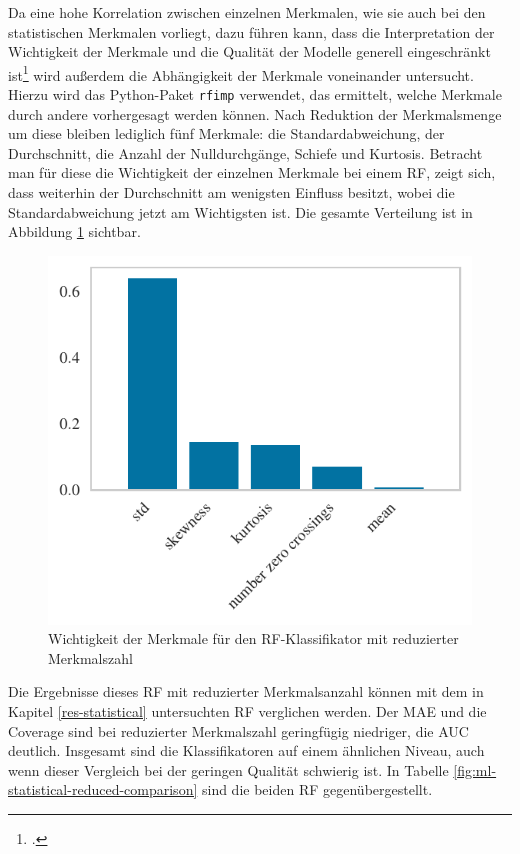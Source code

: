 Da eine hohe Korrelation zwischen einzelnen Merkmalen, wie sie auch bei den statistischen Merkmalen vorliegt, dazu führen kann, dass die Interpretation der Wichtigkeit der Merkmale und die Qualität der Modelle generell eingeschränkt ist\footcite[Kapitel 8]{Harrison2019} wird außerdem die Abhängigkeit der Merkmale voneinander untersucht. Hierzu wird das Python-Paket \texttt{rfimp} verwendet, das ermittelt, welche Merkmale durch andere vorhergesagt werden können. Nach Reduktion der Merkmalsmenge um diese bleiben lediglich fünf Merkmale: die Standardabweichung, der Durchschnitt, die Anzahl der Nulldurchgänge, Schiefe und Kurtosis. Betracht man für diese die Wichtigkeit der einzelnen Merkmale bei einem \acl{RF}, zeigt sich, dass weiterhin der Durchschnitt am wenigsten Einfluss besitzt, wobei die Standardabweichung jetzt am Wichtigsten ist. Die gesamte Verteilung ist in Abbildung \ref{fig:rf-statistical-reduced} sichtbar.

\begin{figure}[H]
	\centering
	\includegraphics[scale=0.85]{pic/rf-reduced-statistical.pdf}
	\caption{Wichtigkeit der Merkmale für den \ac{RF}-Klassifikator mit reduzierter Merkmalszahl}
	\label{fig:rf-statistical-reduced}
\end{figure}

Die Ergebnisse dieses \acl{RF} mit reduzierter Merkmalsanzahl können mit dem in Kapitel \ref{res-statistical} untersuchten \acl{RF} verglichen werden. Der \ac{MAE} und die Coverage sind bei reduzierter Merkmalszahl geringfügig niedriger, die AUC deutlich. Insgesamt sind die Klassifikatoren auf einem ähnlichen Niveau, auch wenn dieser Vergleich bei der geringen Qualität schwierig ist. In Tabelle \ref{fig:ml-statistical-reduced-comparison} sind die beiden \acl{RF} gegenübergestellt.

